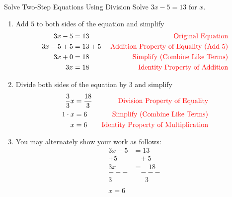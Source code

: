 \begin{example}{Solve Two-Step Equations Using Division}{}
    Solve $3x-5=13$ for $x$.
    \begin{enumerate}
        \item[] Add $5$ to both sides of the equation and simplify
        \begin{align*}
            3x-5&=13&\textcolor{red}{\textrm{   Original Equation}}\\
            3x-5+5&=13+5&\textcolor{red}{\textrm{   Addition Property of Equality (Add 5)}}\\
            3x+0&=18 &\textcolor{red}{\textrm{   Simplify (Combine Like Terms)}}\\
            3x&=18&\textcolor{red}{\textrm{   Identity Property of Addition}}\\            
        \end{align*}
        \item[] Divide both sides of the equation by $3$ and simplify
        \begin{align*}            
            \dfrac{3}{3}x&=\dfrac{18}{3}&\textcolor{red}{\textrm{   Division Property of Equality}}\\
            1\cdot x&=6&\textcolor{red}{\textrm{   Simplify (Combine Like Terms)}}\\
            x&=6&\textcolor{red}{\textrm{   Identity Property of Multiplication}}
        \end{align*}
        \item[] You may alternately show your work as follows:
        \begin{align*}        
            3x-5&=13\\
            +5& \;\;\;+5\\
            3x&=\;\;\;18\\
            ---&\;\;\;---\\
            3&\;\;\;\;\;\;3\\\\
            x=6
        \end{align*}        
    \end{enumerate}
\end{example}
